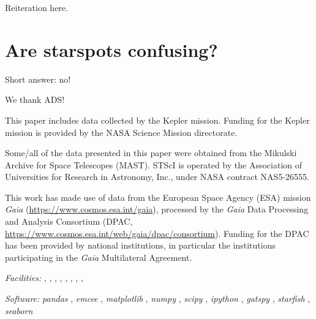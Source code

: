 \documentclass[twocolumn]{emulateapj}%
\newcommand{\project}[1]{\textsl{#1}}
\begin{document}
Reiteration here.

\clearpage
\pagebreak


\appendix

\section{Are starspots confusing?}
\label{methods-details}

Short answer: no!

\acknowledgements

We thank ADS!

This paper includes data collected by the Kepler mission. Funding for the Kepler mission is provided by the NASA Science Mission directorate.

Some/all of the data presented in this paper were obtained from the Mikulski Archive for Space Telescopes (MAST). STScI is operated by the Association of Universities for Research in Astronomy, Inc., under NASA contract NAS5-26555.

This work has made use of data from the European Space Agency (ESA) mission
{\it Gaia} (\url{https://www.cosmos.esa.int/gaia}), processed by the {\it Gaia}
Data Processing and Analysis Consortium (DPAC,
\url{https://www.cosmos.esa.int/web/gaia/dpac/consortium}). Funding for the DPAC
has been provided by national institutions, in particular the institutions
participating in the {\it Gaia} Multilateral Agreement.


{\it Facilities:} , , , , , , , , 

{\it Software: }
 \project{pandas} \citep{mckinney10},
 \project{emcee} \citep{foreman13},
 \project{matplotlib} \citep{hunter07},
 \project{numpy} \citep{vanderwalt11},
 \project{scipy} \citep{jones01},
 \project{ipython} \citep{perez07},
 \project{gatspy} \citep{JakeVanderplas2015},
 \project{starfish} \citep{czekala15},
 \project{seaborn} \citep{waskom14}

\clearpage



\end{document}
